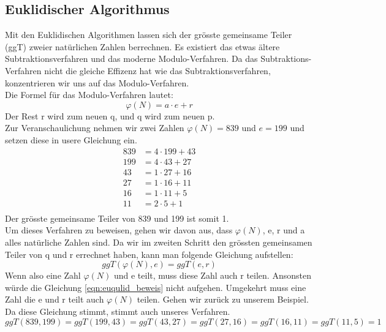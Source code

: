 \subsection{Euklidischer Algorithmus}
Mit den Euklidischen Algorithmen lassen sich der grösste gemeinsame Teiler (ggT) zweier natürlichen Zahlen berrechnen. Es existiert das etwas ältere Subtraktionsverfahren und das moderne Modulo-Verfahren. Da das Subtraktions-Verfahren nicht die gleiche Effizenz hat wie das Subtraktionsverfahren, konzentrieren wir uns auf das Modulo-Verfahren.\\
%
Die Formel für das Modulo-Verfahren lautet:
%
\begin{equation}
  \label{eqn:euklidischer_algo}
  \varphi(N) = a \cdot e + r
\end{equation}
%
Der Rest r wird zum neuen q, und q wird zum neuen p. \\
Zur Veranschaulichung nehmen wir zwei Zahlen $\varphi(N) = 839$ und $e = 199$ und setzen diese in usere Gleichung ein.
%
\begin{equation}
  \begin{split}
    839 &= 4 \cdot 199 + 43\\
    199 &= 4 \cdot 43 + 27\\
    43 &= 1 \cdot 27 + 16\\
    27 &= 1 \cdot 16 + 11\\
    16 &= 1 \cdot 11 + 5\\
    11 &= 2 \cdot 5 + 1\\
    \label{eqn:euqulid_beweis}
  \end{split}
\end{equation}
%
Der grösste gemeinsame Teiler von 839 und 199 ist somit 1. \\[2ex]
Um dieses Verfahren zu beweisen, gehen wir davon aus, dass $\varphi(N)$, e, r und a alles natürliche Zahlen sind. Da wir im zweiten Schritt den grössten gemeinsamen Teiler von q und r errechnet haben, kann man folgende Gleichung aufstellen:
%
\begin{equation}
  ggT(\varphi(N),e) = ggT(e,r)
  \label{eqn:ggT}
\end{equation}
%
Wenn also eine Zahl $\varphi(N)$ und e teilt, muss diese Zahl auch r teilen. Ansonsten würde die Gleichung \ref{eqn:euqulid_beweis} nicht aufgehen. Umgekehrt muss eine Zahl die e und r teilt auch $\varphi(N)$ teilen. 
Gehen wir zurück zu unserem Beispiel. Da diese Gleichung stimmt, stimmt auch unseres Verfahren.
%
\begin{equation*}
 ggT(839,199) = ggT(199,43) = ggT(43,27) = ggT(27,16) = ggT(16,11) = ggT(11,5) = 1
\end{equation*}
%
